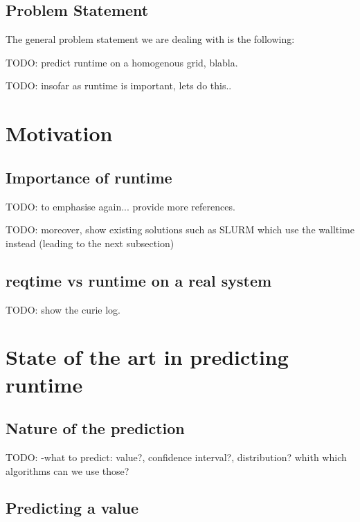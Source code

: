 \documentclass{article}
\begin{document}
\subsection{Problem Statement}
The general problem statement we are dealing with is the following:

TODO: predict runtime on a homogenous grid, blabla.

TODO: insofar as runtime is important, lets do this..

\section{Motivation}

\subsection{Importance of \textbf{runtime}}
\label{sub:importance_of_runtime}
TODO: to emphasise again... provide more references.

TODO: moreover, show existing solutions such as SLURM which use the walltime instead (leading to the next subsection)


\subsection{\textbf{reqtime} vs \textbf{runtime} on a real system}
\label{sub:reqtime_vs_runtime_on_a_real_system}

TODO: show the curie log.



\section{State of the art in predicting \textbf{runtime}}


\subsection{Nature of the prediction}
\label{sub:nature_of_the_prediction}

TODO: -what to predict: value?, confidence interval?, distribution? whith which algorithms can we use those?


\subsection{Predicting a value}
\label{sub:predicting_a_value}
\end{document}
